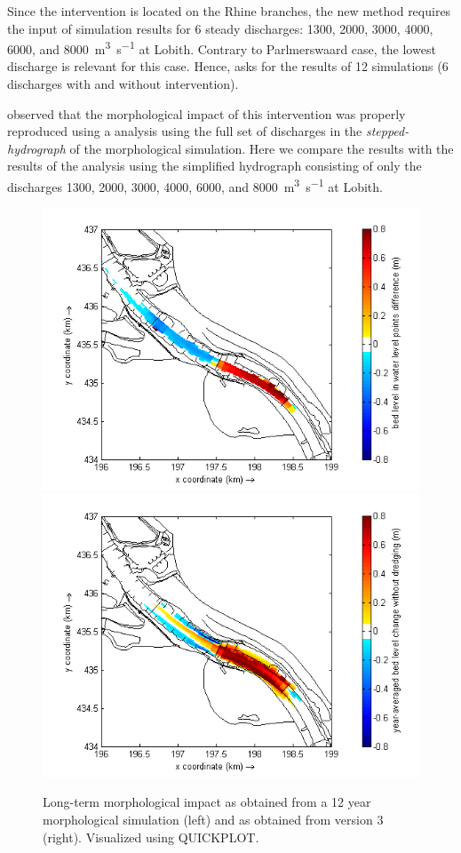 Since the intervention is located on the Rhine branches, the new \dfmi method requires the input of simulation results for 6 steady discharges: 1300, 2000, 3000, 4000, 6000, and \SI{8000}{\metre\cubed\per\second} at Lobith.
Contrary to Parlmerswaard case, the lowest discharge is relevant for this case.
Hence, \dfmi asks for the results of 12 simulations (6 discharges with and without intervention).

\citet{GiriJagers2022} observed that the morphological impact of this intervention was properly reproduced using a \dfmi analysis using the full set of discharges in the \emph{stepped-hydrograph} of the morphological simulation.
Here we compare the results with the results of the \dfmi analysis using the simplified hydrograph consisting of only the discharges 1300, 2000, 3000, 4000, 6000, and \SI{8000}{\metre\cubed\per\second} at Lobith.

\begin{figure}[b]
\includegraphics[width=\columnwidth/2]{figures/Pannerden_delft3d.png}
\includegraphics[width=\columnwidth/2]{figures/Pannerden_dfastmi.png}
\caption{Long-term morphological impact as obtained from a 12 year morphological simulation (left) and as obtained from \dfmi version 3 (right).
Visualized using QUICKPLOT.}
\label{Pannerden_mor}
\end{figure}

